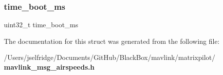 \mbox{\label{struct____mavlink__airspeeds__t_ad4e96ee46e36270d1ab66060e46f8c79}} 
\subsubsection{time\+\_\+boot\+\_\+ms}
{\footnotesize\ttfamily uint32\+\_\+t time\+\_\+boot\+\_\+ms}



The documentation for this struct was generated from the following file\+:\begin{DoxyCompactItemize}
\item 
/\+Users/jselfridge/\+Documents/\+Git\+Hub/\+Black\+Box/mavlink/matrixpilot/\textbf{ mavlink\+\_\+msg\+\_\+airspeeds.\+h}\end{DoxyCompactItemize}
